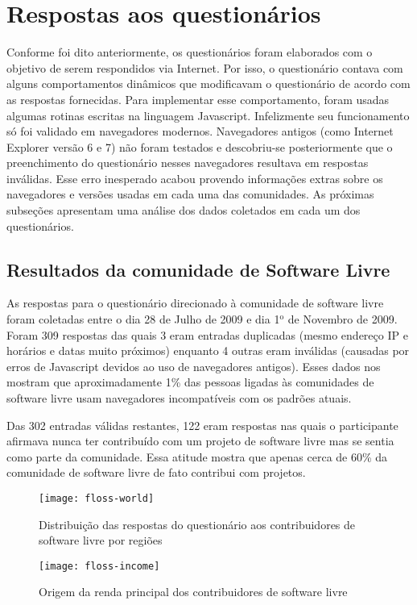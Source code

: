 \section{Respostas aos questionários}
\label{sec:respostas}

Conforme foi dito anteriormente, os questionários foram elaborados com
o objetivo de serem respondidos via Internet. Por isso, o questionário
contava com alguns comportamentos dinâmicos que modificavam o
questionário de acordo com as respostas fornecidas. Para implementar
esse comportamento, foram usadas algumas rotinas escritas na linguagem
Javascript. Infelizmente seu funcionamento só foi validado em
navegadores modernos. Navegadores antigos (como Internet Explorer
versão 6 e 7) não foram testados e descobriu-se posteriormente que o
preenchimento do questionário nesses navegadores resultava em
respostas inválidas. Esse erro inesperado acabou provendo informações
extras sobre os navegadores e versões usadas em cada uma das
comunidades. As próximas subseções apresentam uma análise dos dados
coletados em cada um dos questionários.

\subsection{Resultados da comunidade de Software Livre}
\label{sec:resp-floss}

As respostas para o questionário direcionado à comunidade de software
livre foram coletadas entre o dia 28 de Julho de 2009 e dia
1$^{\textrm{o}}$ de Novembro de 2009. Foram 309 respostas das quais 3
eram entradas duplicadas (mesmo endereço IP e horários e datas muito
próximos) enquanto 4 outras eram inválidas (causadas por erros de
Javascript devidos ao uso de navegadores antigos). Esses dados nos
mostram que aproximadamente 1\% das pessoas ligadas às comunidades de
software livre usam navegadores incompatíveis com os padrões atuais.

Das 302 entradas válidas restantes, 122 eram respostas nas quais o
participante afirmava nunca ter contribuído com um projeto de software
livre mas se sentia como parte da comunidade. Essa atitude mostra que
apenas cerca de 60\% da comunidade de software livre de fato contribui
com projetos.

\begin{figure}[htb]
  \begin{minipage}[t]{0.5\linewidth}
    \centering
    \texttt{[image: floss-world]}
    \caption{Distribuição das respostas do questionário aos
      contribuidores de software livre por regiões}
    \label{fig:floss-world}
  \end{minipage}
  \begin{minipage}[t]{0.5\linewidth}
    \centering
    \texttt{[image: floss-income]}
    \caption{Origem da renda principal dos contribuidores de software
      livre}
    \label{fig:floss-income}
  \end{minipage}
\end{figure}


